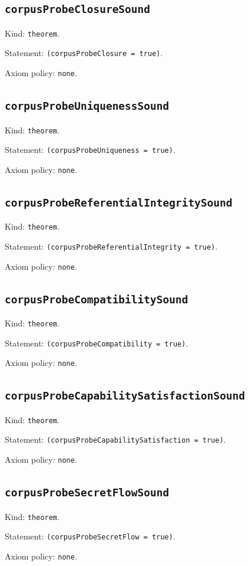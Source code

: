 \documentclass[11pt]{article}
\begin{document}
\subsection*{\texttt{corpusProbeClosureSound}}
\noindent Kind: \texttt{theorem}.\par
\noindent Statement: \texttt{(corpusProbeClosure = true)}.\par
\noindent Axiom policy: \texttt{none}.\par
\subsection*{\texttt{corpusProbeUniquenessSound}}
\noindent Kind: \texttt{theorem}.\par
\noindent Statement: \texttt{(corpusProbeUniqueness = true)}.\par
\noindent Axiom policy: \texttt{none}.\par
\subsection*{\texttt{corpusProbeReferentialIntegritySound}}
\noindent Kind: \texttt{theorem}.\par
\noindent Statement: \texttt{(corpusProbeReferentialIntegrity = true)}.\par
\noindent Axiom policy: \texttt{none}.\par
\subsection*{\texttt{corpusProbeCompatibilitySound}}
\noindent Kind: \texttt{theorem}.\par
\noindent Statement: \texttt{(corpusProbeCompatibility = true)}.\par
\noindent Axiom policy: \texttt{none}.\par
\subsection*{\texttt{corpusProbeCapabilitySatisfactionSound}}
\noindent Kind: \texttt{theorem}.\par
\noindent Statement: \texttt{(corpusProbeCapabilitySatisfaction = true)}.\par
\noindent Axiom policy: \texttt{none}.\par
\subsection*{\texttt{corpusProbeSecretFlowSound}}
\noindent Kind: \texttt{theorem}.\par
\noindent Statement: \texttt{(corpusProbeSecretFlow = true)}.\par
\noindent Axiom policy: \texttt{none}.\par
\end{document}
